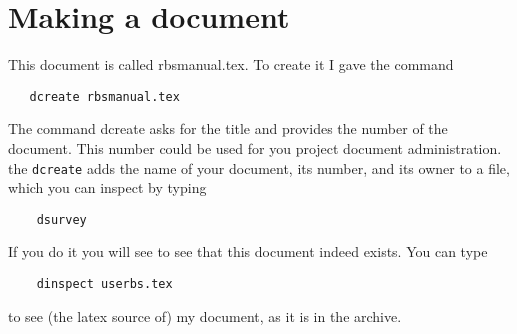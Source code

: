 \section{Making a document}
This document is called rbsmanual.tex. To create it I gave the command
\begin{verbatim}
   dcreate rbsmanual.tex
\end{verbatim}
The command dcreate asks for the title and provides the number of the document.
This number could be used for you project document administration.
the \verb+dcreate+ adds the name of your document, its number, and its
owner to a file, which you can inspect by typing
\begin{verbatim}
    dsurvey
\end{verbatim}
If you do it you will see to see that this document indeed exists.
 You can type
\begin{verbatim}
    dinspect userbs.tex
\end{verbatim}
to see (the latex source of) my document, as it is in the archive. 

